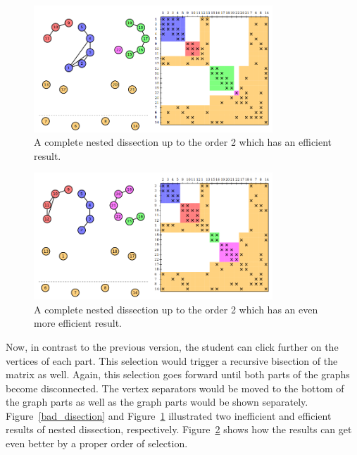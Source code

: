 \documentclass[12pt, twoside,a4paper,toc=bibliography]{scrbook}
\begin{document}
\begin{figure}
\centering
\includegraphics[width=0.8\textwidth]{good_disection}
\caption{A complete nested dissection up to the order 2 which has an
efficient result.}
\label{good_disection}
\end{figure}

\begin{figure}
\centering
\includegraphics[width=0.8\textwidth]{good_disection2}
\caption{A complete nested dissection up to the order 2 which has an
even more efficient result.}
\label{good_disection2}
\end{figure}

Now, in contrast to the previous version, the student can click further
on the vertices of each part. This selection would trigger a recursive
bisection of the matrix as well. Again, this selection goes forward until
both parts of the graphs become disconnected. The vertex separators
would be moved to the bottom of the graph parts as well as the graph parts
would be shown separately. Figure~\ref{bad_disection} and Figure~\ref{good_disection} illustrated two inefficient and efficient results of nested dissection,
respectively. Figure~\ref{good_disection2} shows how the results can
get even better by a proper order of selection.
\end{document}
